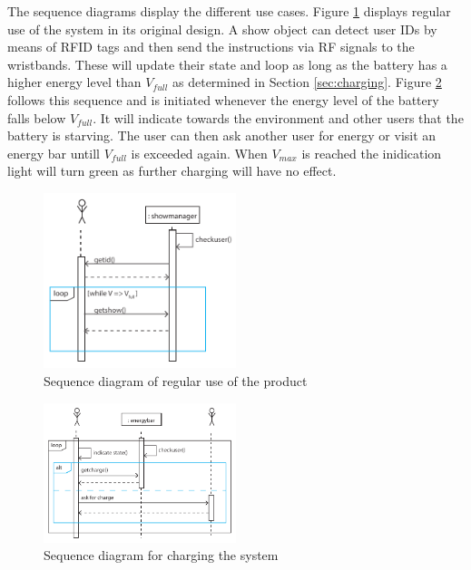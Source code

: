 The sequence diagrams display the different use cases. Figure \ref{fig:sequenceshow} displays regular use of the system in its original design. A show object can detect user IDs by means of RFID tags and then send the instructions via RF signals to the wristbands. These will update their state and loop as long as the battery has a higher energy level than $V_{full}$ as determined in Section \ref{sec:charging}. Figure \ref{fig:sequencecharge} follows this sequence and is initiated whenever the energy level of the battery falls below $V_{full}$. It will indicate towards the environment and other users that the battery is starving. The user can then ask another user for energy or visit an energy bar untill $V_{full}$ is exceeded again. When $V_{max}$ is reached the inidication light will turn green as further charging will have no effect.
%
\begin{figure}[h!]
\centering
\includegraphics[width=0.5\textwidth]{sequenceshow.pdf}
\caption{Sequence diagram of regular use of the product}
\label{fig:sequenceshow}
\end{figure}

\begin{figure}[h!]
\centering
\includegraphics[width=0.5\textwidth]{sequencecharge.pdf}
\caption{Sequence diagram for charging the system}
\label{fig:sequencecharge}
\end{figure}

